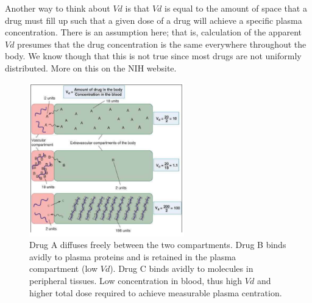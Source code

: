 \documentclass{book}
\begin{document}
Another way to think about $Vd$ is that $Vd$ is equal to the amount of space that a drug
must fill up such that a given dose of a drug will achieve a specific plasma concentration. 
There is an assumption here; that is, calculation of the apparent $Vd$ presumes that the drug concentration is the same everywhere throughout the body.
We know though that this is not true since most drugs are not uniformly distributed.
More on this on the NIH website\cite{NIH}.

\begin{figure}
    \includegraphics[width=0.6\textwidth, center]{images/image5.png}
    \caption{Drug A diffuses freely between the two compartments. Drug B binds avidly to plasma proteins and is retained in the plasma compartment (low $Vd$). Drug C binds avidly to molecules in peripheral tissues. Low concentration in blood, thus high $Vd$ and higher total dose required to achieve measurable plasma centration.}
\end{figure}


\printbibliography
\end{document}
